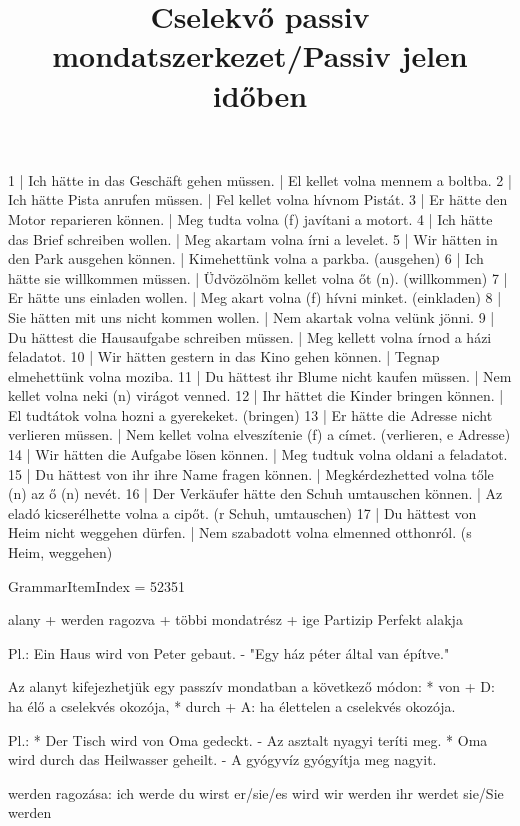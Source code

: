 \begin{exmp}
1 | Ich hätte in das Geschäft gehen müssen. | El kellet volna mennem a boltba.
2 | Ich hätte Pista anrufen müssen. | Fel kellet volna hívnom Pistát.
3 | Er hätte den Motor reparieren können. | Meg tudta volna (f) javítani a motort.
4 | Ich hätte das Brief schreiben wollen. | Meg akartam volna írni a levelet.
5 | Wir hätten in den Park ausgehen können. | Kimehettünk volna a parkba. (ausgehen)
6 | Ich hätte sie willkommen müssen. | Üdvözölnöm kellet volna őt (n). (willkommen)
7 | Er hätte uns einladen wollen. | Meg akart volna (f) hívni minket. (einkladen)
8 | Sie hätten mit uns nicht kommen wollen. | Nem akartak volna velünk jönni.
9 | Du hättest die Hausaufgabe schreiben müssen. | Meg kellett volna írnod a házi feladatot.
10 | Wir hätten gestern in das Kino gehen können. | Tegnap elmehettünk volna moziba.
11 | Du hättest ihr Blume nicht kaufen müssen. | Nem kellet volna neki (n) virágot venned.
12 | Ihr hättet die Kinder bringen können. | El tudtátok volna hozni a gyerekeket. (bringen)
13 | Er hätte die Adresse nicht verlieren müssen. | Nem kellet volna elveszítenie (f) a címet. (verlieren, e Adresse)
14 | Wir hätten die Aufgabe lösen können. | Meg tudtuk volna oldani a feladatot.
15 | Du hättest von ihr ihre Name fragen können. | Megkérdezhetted volna tőle (n) az ő (n) nevét.
16 | Der Verkäufer hätte den Schuh umtauschen können. | Az eladó kicserélhette volna a cipőt. (r Schuh, umtauschen)
17 | Du hättest von Heim nicht weggehen dürfen. | Nem szabadott volna elmenned otthonról. (s Heim, weggehen)
\end{exmp}

\title{Cselekvő passiv mondatszerkezet/Passiv jelen időben}

GrammarItemIndex = 52351

\begin{desc}
alany + werden ragozva + többi mondatrész + ige Partizip Perfekt alakja

Pl.: Ein Haus wird von Peter gebaut. - "Egy ház péter által van építve."

Az alanyt kifejezhetjük egy passzív mondatban a következő módon:
* von + D: ha élő a cselekvés okozója,
* durch + A: ha élettelen a cselekvés okozója.

Pl.: * Der Tisch wird von Oma gedeckt. - Az asztalt nyagyi teríti meg.
* Oma wird durch das Heilwasser geheilt. - A gyógyvíz gyógyítja meg nagyit.

werden ragozása:
ich werde
du wirst
er/sie/es wird
wir werden
ihr werdet
sie/Sie werden
\end{desc}

